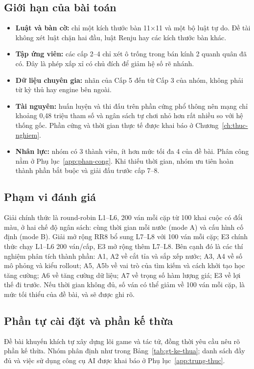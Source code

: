 \subsection{Giới hạn của bài toán}
\label{sec:gt-pham-vi-gioi-han}
\begin{itemize}
  \item \textbf{Luật và bàn cờ:} chỉ một kích thước bàn 11×11 và một bộ luật tự do. Đề tài không xét luật chặn hai đầu, luật Renju hay các kích thước bàn khác.
  \item \textbf{Tập ứng viên:} các cấp 2--4 chỉ xét ô trống trong bán kính 2 quanh quân đã có. Đây là phép xấp xỉ có chủ đích để giảm hệ số rẽ nhánh.
  \item \textbf{Dữ liệu chuyên gia:} nhãn của Cấp 5 đến từ Cấp 3 của nhóm, không phải từ kỳ thủ hay engine bên ngoài.
  \item \textbf{Tài nguyên:} huấn luyện và thi đấu trên phần cứng phổ thông nên mạng chỉ khoảng 0,48 triệu tham số và ngân sách tự chơi nhỏ hơn rất nhiều so với hệ thống gốc. Phần cứng và thời gian thực tế được khai báo ở Chương~\ref{ch:thuc-nghiem}.
  \item \textbf{Nhân lực:} nhóm có 3 thành viên, ít hơn mức tối đa 4 của đề bài. Phân công nằm ở Phụ lục~\ref{app:phan-cong}. Khi thiếu thời gian, nhóm ưu tiên hoàn thành phần bắt buộc và giải đấu trước cấp 7--8.
\end{itemize}

\subsection{Phạm vi đánh giá}
\label{sec:gt-pham-vi-danh-gia}
Giải chính thức là round-robin L1--L6, 200 ván mỗi cặp từ 100 khai cuộc có đổi màu, ở hai chế độ ngân sách: cùng thời gian mỗi nước (mode A) và cấu hình cố định (mode B). Giải mở rộng RR8 bổ sung L7--L8 với 100 ván mỗi cặp; E3 chính thức chạy L1--L6 200 ván/cấp, E3 mở rộng thêm L7--L8. Bên cạnh đó là các thí nghiệm phân tích thành phần: A1, A2 về cắt tỉa và sắp xếp nước; A3, A4 về số mô phỏng và kiểu rollout; A5, A5b về vai trò của tìm kiếm và cách khởi tạo học tăng cường; A6 về tăng cường dữ liệu; A7 về trọng số hàm lượng giá; E3 về lợi thế đi trước. Nếu thời gian không đủ, số ván có thể giảm về 100 ván mỗi cặp, là mức tối thiểu của đề bài, và sẽ được ghi rõ.

\subsection{Phần tự cài đặt và phần kế thừa}
\label{sec:gt-ke-thua}
Đề bài khuyến khích tự xây dựng lõi game và tác tử, đồng thời yêu cầu nêu rõ phần kế thừa. Nhóm phân định như trong Bảng~\ref{tab:gt-ke-thua}; danh sách đầy đủ và việc sử dụng công cụ AI được khai báo ở Phụ lục~\ref{app:trung-thuc}.

